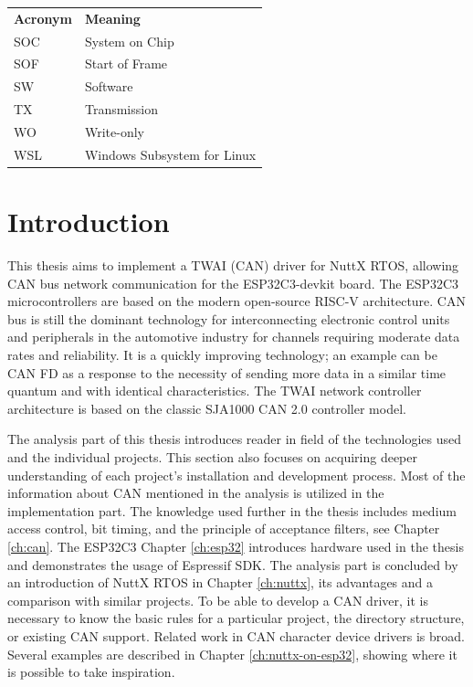 \documentclass{ctuthesis}
\begin{document}
\begin{tabularx}{\linewidth}
  { l >{\raggedright\arraybackslash}X }
\bfseries Acronym  & \bfseries Meaning \\\Midrule
SOC & System on Chip \\
SOF & Start of Frame \\
SW & Software \\
TX & Transmission \\
WO & Write-only \\
WSL & Windows Subsystem for Linux \\

\end{tabularx}

\chapter{Introduction}
 This thesis aims to implement a TWAI (CAN) driver for NuttX RTOS, allowing CAN bus network communication for the ESP32C3-devkit board. The ESP32C3 microcontrollers are based on the modern open-source RISC-V architecture. 
 CAN bus is still the dominant technology for interconnecting electronic control units 
 and peripherals in the automotive industry for channels requiring moderate data rates and reliability. It is a quickly improving technology; an example can be CAN FD as a response to the necessity of sending more data in a similar time quantum and with identical characteristics. The TWAI network controller architecture is based on the classic SJA1000 CAN 2.0 controller model. \newline
 
 \quad The analysis part of this thesis introduces reader in field of the technologies used and the individual projects. This section also focuses on acquiring deeper understanding of each project's installation and development process. Most of the information about CAN mentioned in the analysis is utilized in the implementation part. The knowledge used further in the thesis includes medium access control, bit timing, and the principle of acceptance filters, see Chapter \ref{ch:can}. The ESP32C3 Chapter \ref{ch:esp32} introduces hardware used in the thesis and demonstrates the usage of Espressif SDK. The analysis part is concluded by an introduction of NuttX RTOS in Chapter \ref{ch:nuttx}, its advantages and a comparison with similar projects. To be able to develop a CAN driver, it is necessary to know the basic rules for a particular project, the directory structure, or existing CAN support. Related work in CAN character device drivers is broad. Several examples are described in Chapter \ref{ch:nuttx-on-esp32}, showing where it is possible to take inspiration. \newline
 
\end{document}
